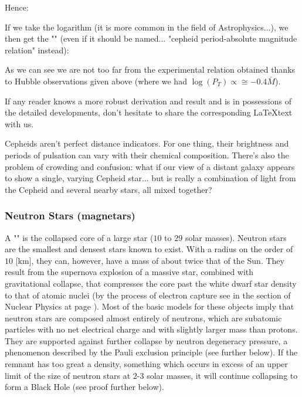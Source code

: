 	Hence:
	
	If we take the logarithm (it is more common in the field of Astrophysics...), we then get the "" (even if it should be named... "cepheid period-absolute magnitude relation" instead):
	
	As we can see we are not too far from the experimental relation obtained thanks to Hubble observations given above (where we had $\log(P_T) \propto \cong -0.4\bar{M}$).
	\begin{tcolorbox}[title=Remark,colframe=black,arc=10pt]
	If any reader knows a more robust derivation and result and is in possessions of the detailed developments, don't hesitate to share the corresponding \LaTeX text with us.
	\end{tcolorbox}
	
	Cepheids aren't perfect distance indicators. For one thing, their brightness and periods of pulsation can vary with their chemical composition. There's also the problem of crowding and confusion: what if our view of a distant galaxy appears to show a single, varying Cepheid star... but is really a combination of light from the Cepheid and several nearby stars, all mixed together?
	
	\subsubsection{Neutron Stars (magnetars)}\label{neutron star}
	A "" is the collapsed core of a large star ($10$ to $29$ solar masses). Neutron stars are the smallest and densest stars known to exist. With a radius on the order of $10$ [km], they can, however, have a mass of about twice that of the Sun. They result from the supernova explosion of a massive star, combined with gravitational collapse, that compresses the core past the white dwarf star density to that of atomic nuclei (by the process of electron capture see in the section of Nuclear Physics at page \pageref{electron capture}). Most of the basic models for these objects imply that neutron stars are composed almost entirely of neutrons, which are subatomic particles with no net electrical charge and with slightly larger mass than protons. They are supported against further collapse by neutron degeneracy pressure, a phenomenon described by the Pauli exclusion principle (see further below). If the remnant has too great a density, something which occurs in excess of an upper limit of the size of neutron stars at $2$-$3$ solar masses, it will continue collapsing to form a Black Hole (see proof further below).
	
